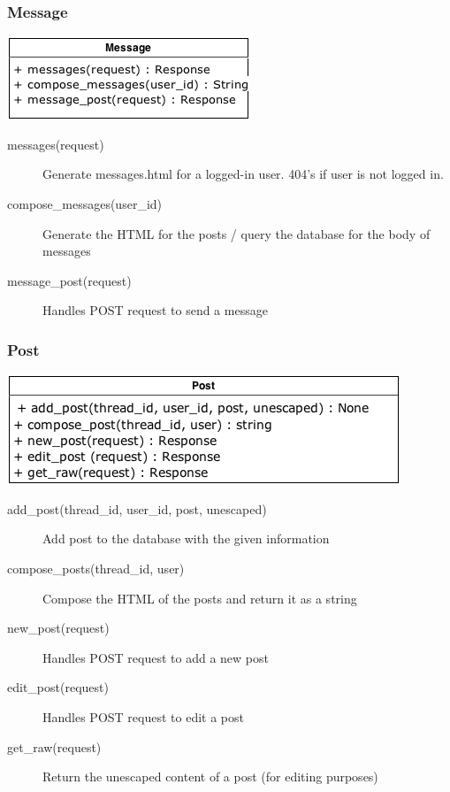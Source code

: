 \documentclass[12pt]{scrartcl}
\begin{document}
\subsubsection{Message}
\includegraphics[keepaspectratio]{umls/message_uml.png}
\begin{description}
\item [messages(request)] Generate messages.html for a logged-in user. 404’s if user is not logged in.
\item [compose\_messages(user\_id)] Generate the HTML for the posts / query the database for the body of messages
\item [ message\_post(request)] Handles POST request to send a message
\end{description}

\subsubsection{Post}
\includegraphics[keepaspectratio]{umls/post_uml.png}
\begin{description}
\item [add\_post(thread\_id, user\_id, post, unescaped)] Add post to the database with the given information
\item [compose\_posts(thread\_id, user)] Compose the HTML of the posts and return it as a string
\item [new\_post(request)] Handles POST request to add a new post
\item [edit\_post(request)] Handles POST request to edit a post
\item [get\_raw(request)] Return the unescaped content of a post (for editing purposes)
\end{description}
\end{document}
